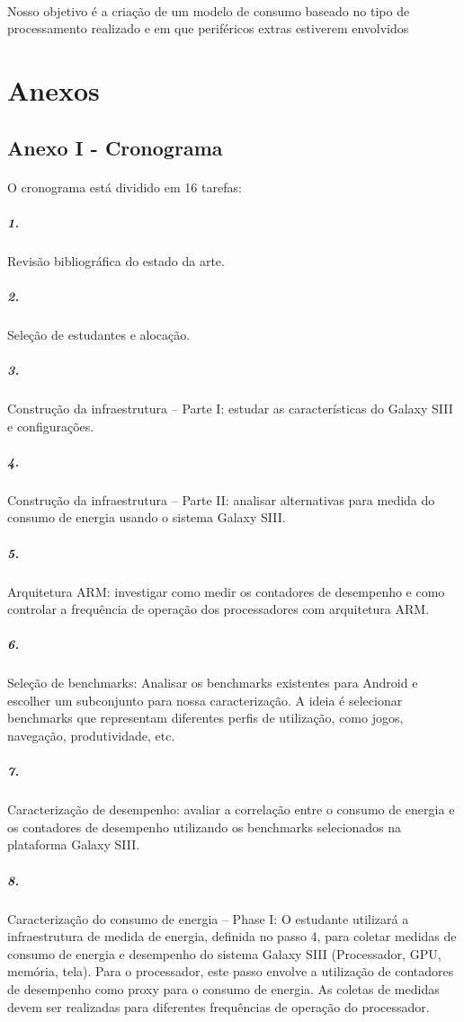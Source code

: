 \documentclass[11pt,a4paper,titlepage]{article}
\begin{document}
\paragraph{} Nosso objetivo é a criação de um modelo de consumo baseado no tipo de processamento realizado e em que periféricos extras estiverem envolvidos
\section{Anexos}
\subsection{Anexo I - Cronograma}
\paragraph{} O cronograma está dividido em 16 tarefas:\\
\subparagraph{1.} Revisão bibliográfica do estado da arte. \\
\subparagraph{2.} Seleção de estudantes e alocação. \\
\subparagraph{3.} Construção da infraestrutura – Parte I: estudar as características do Galaxy SIII e configurações. \\
\subparagraph{4.} Construção da infraestrutura – Parte II: analisar alternativas para medida do consumo de energia usando o sistema Galaxy SIII.\\ 
\subparagraph{5.} Arquitetura ARM: investigar como medir os contadores de desempenho e como controlar a frequência de operação dos processadores com arquitetura ARM. \\
\subparagraph{6.} Seleção de benchmarks: Analisar os benchmarks existentes para Android e escolher um subconjunto para nossa caracterização. A ideia é selecionar benchmarks que representam diferentes perfis de utilização, como jogos, navegação, produtividade, etc. \\
\subparagraph{7.} Caracterização de desempenho: avaliar a correlação entre o consumo de energia e os contadores de desempenho utilizando os benchmarks selecionados na plataforma Galaxy SIII. \\
\subparagraph{8.} Caracterização do consumo de energia – Phase I: O estudante utilizará a infraestrutura de medida de energia, definida no passo 4, para coletar medidas de consumo de energia e desempenho do sistema Galaxy SIII (Processador, GPU, memória, tela). Para o processador, este passo envolve a utilização de contadores de desempenho como proxy para o consumo de energia. As coletas de medidas devem ser realizadas para diferentes frequências de operação do processador. \\
\end{document}
